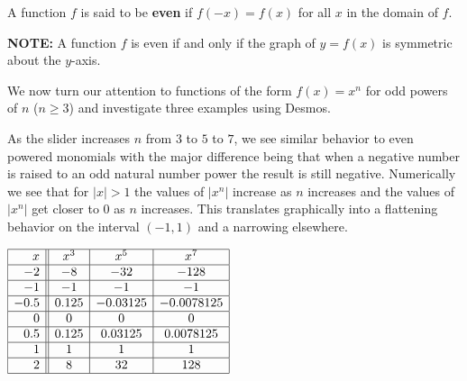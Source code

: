 \documentclass{ximera}
\begin{document}


\begin{definition} \label{evenfunctiondefn} A function $f$ is said to be \textbf{even} if $f(-x) = f(x)$ for all $x$ in the domain of $f$.  

\textbf{NOTE:}  A function  $f$ is even if and only if the graph of  $y = f(x)$ is symmetric about the $y$-axis.

\end{definition}



We now turn our attention to functions of the form $f(x) = x^{n}$ for odd powers of $n$ ($n \geq 3$) and investigate three examples using Desmos.

\begin{center} 
\end{center}

As the slider increases $n$ from $3$ to $5$ to $7$, we see similar behavior to even powered monomials with the major difference being that when a negative number is raised to an odd natural number power the result is still negative.  Numerically we see that for $|x| > 1$ the values of $|x^n|$ increase as $n$ increases and the values of $|x^n|$ get closer to $0$ as $n$ increases.  This translates graphically into a flattening behavior on the interval $(-1, 1)$ and a narrowing elsewhere. 

\begin{center}
$\begin{array}{|r||c|c|c|}  \hline

 x &  x^3 & x^5 & x^7 \\ \hline
 -2 & -8& -32& -128 \\  \hline
 -1 & -1 & -1&  -1\\  \hline
 -0.5 & 0.125 & -0.03125&  -0.0078125 \\  \hline
 0 &  0 & 0 & 0 \\  \hline
 0.5 & 0.125  &  0.03125 & 0.0078125 \\  \hline
 1&  1 & 1&  1 \\  \hline
 2 & 8 & 32 & 128 \\  \hline
\end{array}$
\end{center}
\end{document}

